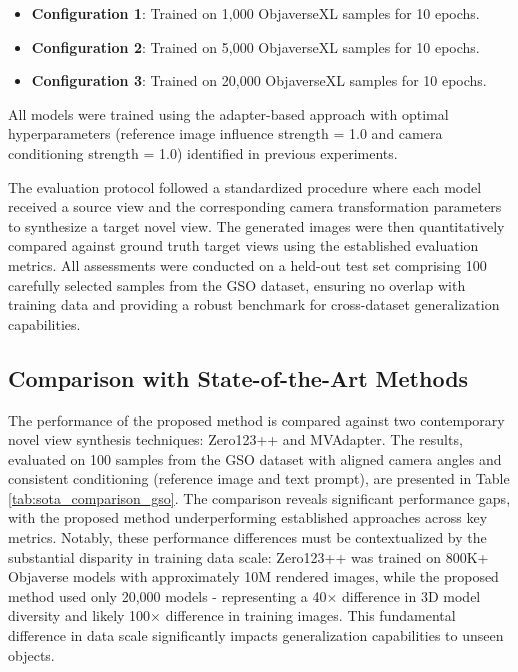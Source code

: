 \begin{itemize}
  \item \textbf{Configuration 1}: Trained on 1,000 ObjaverseXL samples for 10 epochs.
  \item \textbf{Configuration 2}: Trained on 5,000 ObjaverseXL samples for 10 epochs.
  \item \textbf{Configuration 3}: Trained on 20,000 ObjaverseXL samples for 10 epochs.
\end{itemize}

All models were trained using the adapter-based approach with optimal hyperparameters (reference image influence strength = 1.0 and camera conditioning strength = 1.0) identified in previous experiments.

The evaluation protocol followed a standardized procedure where each model received a source view and the corresponding camera transformation parameters to synthesize a target novel view. The generated images were then quantitatively compared against ground truth target views using the established evaluation metrics. All assessments were conducted on a held-out test set comprising 100 carefully selected samples from the GSO dataset, ensuring no overlap with training data and providing a robust benchmark for cross-dataset generalization capabilities.

\subsection{Comparison with State-of-the-Art Methods}\label{ssec:exp_sota_comparison}
The performance of the proposed method is compared against two contemporary novel view synthesis techniques: Zero123++ and MVAdapter. The results, evaluated on 100 samples from the GSO dataset with aligned camera angles and consistent conditioning (reference image and text prompt), are presented in Table \ref{tab:sota_comparison_gso}. The comparison reveals significant performance gaps, with the proposed method underperforming established approaches across key metrics. Notably, these performance differences must be contextualized by the substantial disparity in training data scale: Zero123++ was trained on 800K+ Objaverse models with approximately 10M rendered images, while the proposed method used only 20,000 models - representing a 40$\times$ difference in 3D model diversity and likely 100$\times$ difference in training images. This fundamental difference in data scale significantly impacts generalization capabilities to unseen objects.

